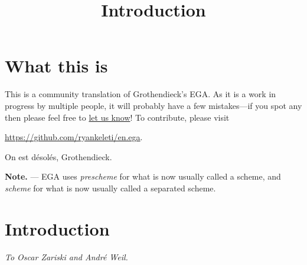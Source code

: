 


\title{Introduction}
\maketitle

\label{section-phantom}

\tableofcontents

\section*{What this is}
\label{what-this-is-section}

\noindent
This is a community translation of Grothendieck's EGA.
As it is a work in progress by multiple people, it will probably have a few
mistakes---if you spot any then please feel free to
\href{https://github.com/ryankeleti/en.ega/issues}{let us know}!
To contribute, please visit
\begin{center}
\url{https://github.com/ryankeleti/en.ega}.
\end{center}
On est d\'esol\'es, Grothendieck.

\medskip\noindent
\textbf{Note.} --- EGA uses \textit{prescheme} for what is now usually
called a scheme, and \textit{scheme} for what is now usually called a separated scheme.

\section*{Introduction}
\label{intro-section}

\begin{flushright}
\emph{To Oscar Zariski and Andr\'e Weil.}
\end{flushright}
\medskip

